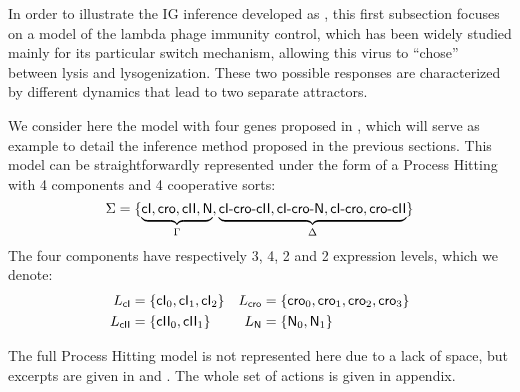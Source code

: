 

\newcommand{\cI}{\f{cI}}
\newcommand{\cro}{\f{cro}}
\newcommand{\cII}{\f{cII}}
\newcommand{\N}{\f{N}}

\newcommand{\tcIcrocII}{cI\mbox{-}cro\mbox{-}cII}
\newcommand{\tcIcroN}{cI\mbox{-}cro\mbox{-}N}
\newcommand{\tcIcro}{cI\mbox{-}cro}
\newcommand{\cIcrocII}{\f{\tcIcrocII}}
\newcommand{\cIcroN}{\f{\tcIcroN}}
\newcommand{\cIcro}{\f{\tcIcro}}

\newcommand{\tcrocII}{cro\mbox{-}cII}
\newcommand{\crocII}{\f{\tcrocII}}

In order to illustrate the IG inference developed as ,
this first subsection focuses on a model of the lambda phage immunity control,
which has been widely studied mainly for its particular switch mechanism,
allowing this virus to “chose” between lysis and lysogenization.
These two possible responses are characterized by different dynamics that lead to two
separate attractors.

We consider here the model with four genes proposed in \cite{thieffry_dynamical_1995},
which will serve as example to detail the inference method proposed in the previous sections.
This model can be straightforwardly represented under the form of a Process Hitting
with 4 components %
and 4 cooperative sorts: %
\[\PHs = \{ \underbrace{\cI, \cro, \cII, \N}_{\Gamma},
  \underbrace{\cIcrocII, \cIcroN, \cIcro, \crocII}_{\Delta} \}\]
The four components have respectively 3, 4, 2 and 2 expression levels,
which we denote:
\begin{align*}
  \PHl_{\cI} &= \{ \cI_0, \cI_1, \cI_2 \} &
  \PHl_{\cro} &= \{ \cro_0, \cro_1, \cro_2, \cro_3 \} \\
  \PHl_{\cII} &= \{ \cII_0, \cII_1 \} &
  \PHl_{\N} &= \{ \N_0, \N_1 \} \\
\end{align*}

The full Process Hitting model is not represented here due to a lack of space,
but excerpts are given in  and .
The whole set of actions is given in appendix.



